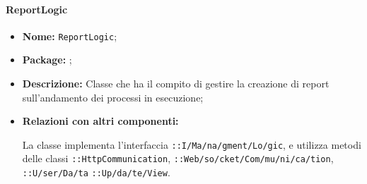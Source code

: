\paragraph{ReportLogic}
\begin{flushleft}
\begin{itemize}
\item \textbf{Nome:} \texttt{ReportLogic};
\item \textbf{Package:} \texttt{\logicUser{}};
\item \textbf{Descrizione:} Classe che ha il compito di gestire la creazione di report sull'andamento dei processi in esecuzione;
\item \textbf{Relazioni con altri componenti:}
\begin{sloppypar}
La classe implementa l'interfaccia \texttt{\iLogicUser{}::I\fshyp{}Ma\fshyp{}na\fshyp{}gment\fshyp{}Lo\fshyp{}gic}, e utilizza metodi delle classi \texttt{\serverCommunication{}::HttpCommunication}, \texttt{\serverCommunication{}::Web\fshyp{}so\fshyp{}cket\fshyp{}Com\fshyp{}mu\fshyp{}ni\fshyp{}ca\fshyp{}tion}, \texttt{\modelUser{}::U\fshyp{}ser\fshyp{}Da\fshyp{}ta} \texttt{\logicUser{}::Up\fshyp{}da\fshyp{}te\fshyp{}View}.
\end{sloppypar}
\end{itemize}
\end{flushleft}
